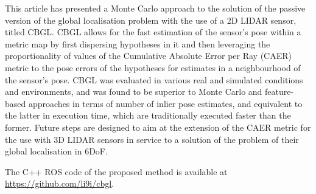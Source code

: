 This article has presented a Monte Carlo approach to the solution of the
passive version of the global localisation problem with the use of a 2D LIDAR
sensor, titled CBGL. CBGL allows for the fast estimation of the sensor's pose
within a metric map by first dispersing hypotheses in it and then leveraging
the proportionality of values of the Cumulative Absolute Error per Ray (CAER)
metric to the pose errors of the hypotheses for estimates in a neighbourhood of
the sensor's pose. CBGL was evaluated in various real and simulated conditions
and environments, and was found to be superior to Monte Carlo and feature-based
approaches in terms of number of inlier pose estimates, and equivalent to the
latter in execution time, which are traditionally executed faster than the
former. Future steps are designed to aim at the extension of the CAER metric
for the use with 3D LIDAR sensors in service to a solution of the problem of
their global localisation in 6DoF.

The C++ ROS code of the proposed method is available at
\url{https://github.com/li9i/cbgl}.
